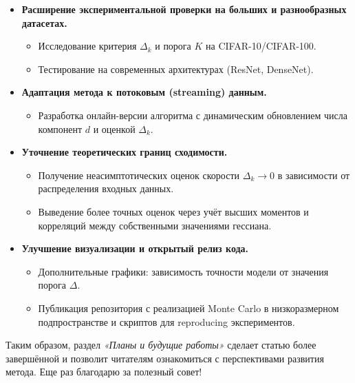 \documentclass[11pt]{article}
\begin{document}
\begin{itemize}
    \item \textbf{Расширение экспериментальной проверки на больших и разнообразных датасетах.}
    \begin{itemize}
        \item Исследование критерия \(\Delta_k\) и порога \(K\) на CIFAR-10/CIFAR-100.
        \item Тестирование на современных архитектурах (ResNet, DenseNet).
    \end{itemize}

    \item \textbf{Адаптация метода к потоковым (streaming) данным.}
    \begin{itemize}
        \item Разработка онлайн-версии алгоритма с динамическим обновлением числа компонент \(d\) и оценкой \(\Delta_k\).
    \end{itemize}

    \item \textbf{Уточнение теоретических границ сходимости.}
    \begin{itemize}
        \item Получение неасимптотических оценок скорости \(\Delta_k \to 0\) в зависимости от распределения входных данных.
        \item Выведение более точных оценок через учёт высших моментов и корреляций между собственными значениями гессиана.
    \end{itemize}

    \item \textbf{Улучшение визуализации и открытый релиз кода.}
    \begin{itemize}
        \item Дополнительные графики: зависимость точности модели от значения порога \(\Delta\).
        \item Публикация репозитория с реализацией Monte Carlo в низкоразмерном подпространстве и скриптов для reproducing экспериментов.
    \end{itemize}
\end{itemize}

Таким образом, раздел \emph{«Планы и будущие работы»} сделает статью более завершённой и позволит читателям ознакомиться с перспективами развития метода. Еще раз благодарю за полезный совет!
\end{document}
